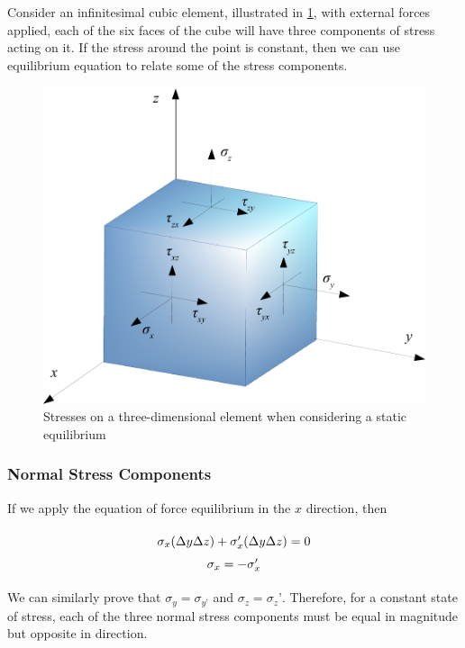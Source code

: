 \documentclass[
10pt,
a4paper,
openany,
svgnames,
]{book}
\begin{document}
Consider an infinitesimal cubic element, illustrated in \cref{fig: 3d-stress-element}, with external forces applied, each of the six faces of the cube will have three components of stress acting on it. If the stress around the point is constant, then we can use equilibrium equation to relate some of the stress components.

\begin{figure}[h]
  \centering
  \includegraphics[scale=0.6]{pictures/Static-body-load-analysis/3d-element-stress}
  \caption{Stresses on a three-dimensional element when considering a static equilibrium}
  \label{fig: 3d-stress-element}
\end{figure}
  
\subsubsection{Normal Stress Components}

If we apply the equation of force equilibrium in the $x$ direction, then

\begin{equation}
  \arraycolsep=1.4pt\def\arraystretch{1.5}
  \begin{array}{c}
    \sigma _x(\Delta y\Delta z) + \sigma_x'(\Delta y\Delta z) = 0\\
    \sigma _x =  - \sigma_x'
  \end{array}
\end{equation}

We can similarly prove that $\sigma_y = \sigma_{y’}$ and $\sigma_z = \sigma_z’$. Therefore, for a constant state of stress, each of the three normal stress components must be equal in magnitude but opposite in direction.
\end{document}
